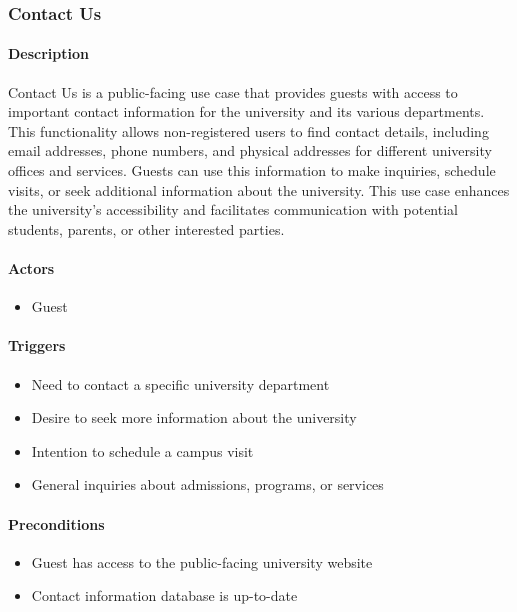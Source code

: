 \subsubsection{Contact Us}

\paragraph{Description}
Contact Us is a public-facing use case that provides guests with access to important contact information for the university and its various departments. This functionality allows non-registered users to find contact details, including email addresses, phone numbers, and physical addresses for different university offices and services. Guests can use this information to make inquiries, schedule visits, or seek additional information about the university. This use case enhances the university's accessibility and facilitates communication with potential students, parents, or other interested parties.

\paragraph{Actors}
\begin{itemize}
    \item Guest
\end{itemize}

\paragraph{Triggers}
\begin{itemize}
    \item Need to contact a specific university department
    \item Desire to seek more information about the university
    \item Intention to schedule a campus visit
    \item General inquiries about admissions, programs, or services
\end{itemize}

\paragraph{Preconditions}
\begin{itemize}
    \item Guest has access to the public-facing university website
    \item Contact information database is up-to-date
\end{itemize}

